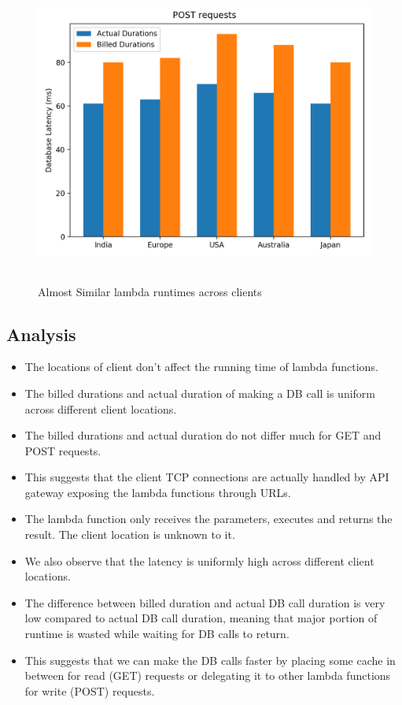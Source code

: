 \begin{figure}[ht]
\centering
\includegraphics[height=10cm]{Images/2post.png}
\caption{Almost Similar lambda runtimes across clients}
\end{figure}

\subsection{Analysis}

\begin{itemize}
    \item The locations of client don’t affect the running time of lambda functions.
    \item The billed durations and actual duration of making a DB call is uniform across different client locations.
    \item The billed durations and actual duration do not differ much for GET and POST requests.
    \item This suggests that the client TCP connections are actually handled by API gateway exposing the lambda functions through URLs.
    \item The lambda function only receives the parameters, executes and returns the result. The client location is unknown to it.
    \item We also observe that the latency is uniformly high across different client locations.
    \item The difference between billed duration and actual DB call duration is very low compared to actual DB call duration, meaning that major portion of runtime is wasted while waiting for DB calls to return.
    \item This suggests that we can make the DB calls faster by placing some cache in between for read (GET) requests or delegating it to other lambda functions for write (POST) requests.
\end{itemize}

